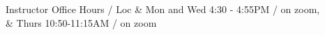 Instructor Office Hours / Loc 			& Mon and Wed 4:30 - 4:55PM  / on zoom, \\
								& Thurs 10:50-11:15AM / on zoom\\